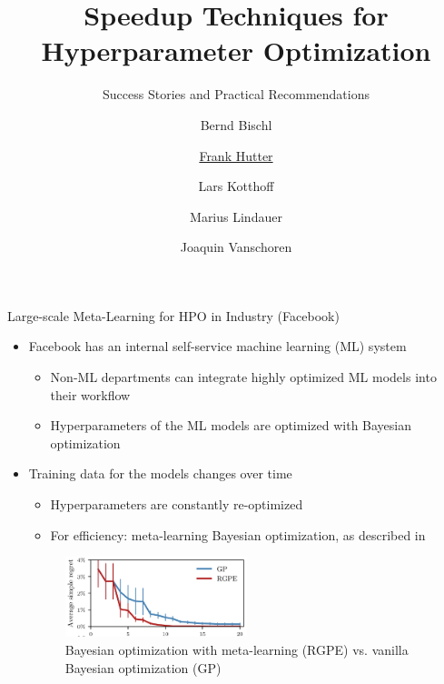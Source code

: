 

\title{Speedup Techniques for Hyperparameter Optimization}
\subtitle{Success Stories and Practical Recommendations}
\author[Frank Hutter]{Bernd Bischl \and \underline{Frank Hutter} \and Lars Kotthoff\newline \and Marius Lindauer \and Joaquin Vanschoren}
\institute{}
\date{}




\maketitle


\begin{frame}[c]{Large-scale Meta-Learning for HPO in Industry (Facebook)}

\begin{itemize}
    \item Facebook has an internal self-service machine learning (ML) system
    \begin{itemize}
    	\item Non-ML departments can integrate highly optimized ML models into their workflow
    	\item Hyperparameters of the ML models are optimized with Bayesian optimization
     \end{itemize}
\bigskip
\pause
    \item Training data for the models changes over time 
    \begin{itemize}
    	\item Hyperparameters are constantly re-optimized 
    	\item For efficiency: meta-learning Bayesian optimization, as described in 
     \end{itemize}   

\medskip
    \begin{figure}
        \centering
        \includegraphics[width=0.5\textwidth]{../w07_hpo_speedup/images/success_stories/FB_RGPE.png}
        \caption{Bayesian optimization with meta-learning (RGPE) vs. vanilla Bayesian optimization (GP)}
    \end{figure}
\end{itemize}

\end{frame}

